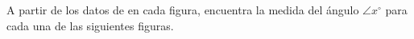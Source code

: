 \documentclass[11pt,addpoints]{exam}
\begin{document}

\begin{questions}
    
    \newpage
    
    \newpage
    
    
    
    \newpage
    

    

    

    


    A partir de los datos de en cada figura, encuentra la medida del \'angulo $\angle x^\circ$ para cada una de las siguientes figuras.


\end{questions}
\end{document}
